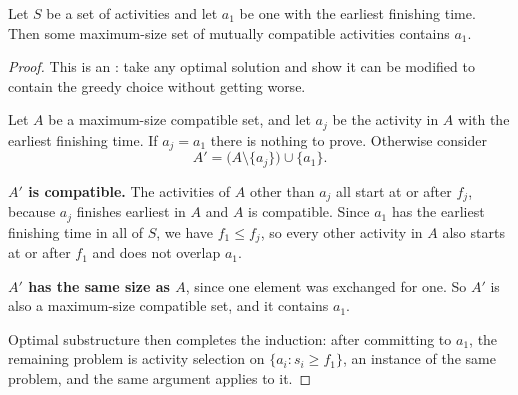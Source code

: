 \begin{theorem}\label{thm:activity}
Let $S$ be a set of activities and let $a_{1}$ be one with the earliest
finishing time. Then some maximum-size set of mutually compatible activities
contains $a_{1}$.
\end{theorem}

\begin{proof}
This is an : take any optimal solution and show it can
be modified to contain the greedy choice without getting worse.

\smallskip
Let $A$ be a maximum-size compatible set, and let $a_{j}$ be the activity in
$A$ with the earliest finishing time. If $a_{j} = a_{1}$ there is nothing to
prove. Otherwise consider
\[ A' = \bigl(A \setminus \{a_{j}\}\bigr) \cup \{a_{1}\}. \]

\smallskip
\textbf{$A'$ is compatible.} The activities of $A$ other than $a_{j}$ all start
at or after $f_{j}$, because $a_{j}$ finishes earliest in $A$ and $A$ is
compatible. Since $a_{1}$ has the earliest finishing time in all of $S$, we
have $f_{1} \le f_{j}$, so every other activity in $A$ also starts at or after
$f_{1}$ and does not overlap $a_{1}$.

\smallskip
\textbf{$A'$ has the same size as $A$}, since one element was exchanged for
one. So $A'$ is also a maximum-size compatible set, and it contains $a_{1}$.

\smallskip
Optimal substructure then completes the induction: after committing to
$a_{1}$, the remaining problem is activity selection on
$\{a_{i} : s_{i} \ge f_{1}\}$, an instance of the same problem, and the same
argument applies to it.
\end{proof}

